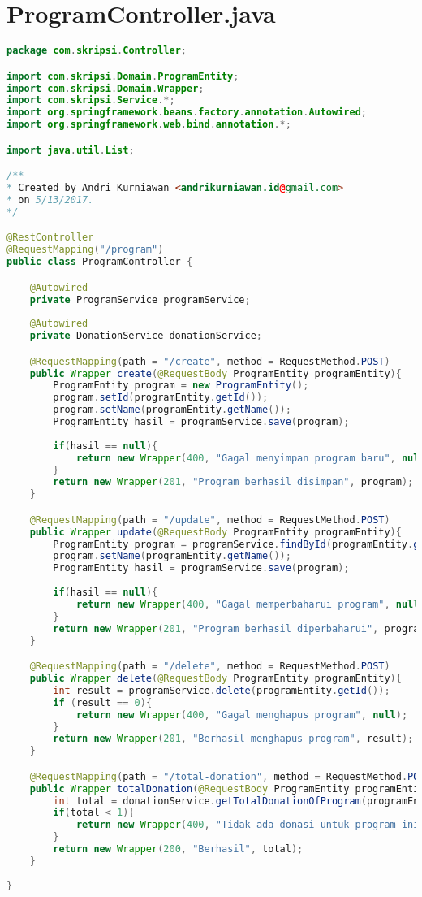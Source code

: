 \newpage
\section*{ProgramController.java}
\begin{lstlisting}[caption={Berkas ProgramController.java},label={lst:ProgramController},language=Java]
package com.skripsi.Controller;

import com.skripsi.Domain.ProgramEntity;
import com.skripsi.Domain.Wrapper;
import com.skripsi.Service.*;
import org.springframework.beans.factory.annotation.Autowired;
import org.springframework.web.bind.annotation.*;

import java.util.List;

/**
* Created by Andri Kurniawan <andrikurniawan.id@gmail.com>
* on 5/13/2017.
*/

@RestController
@RequestMapping("/program")
public class ProgramController {

	@Autowired
	private ProgramService programService;
	
	@Autowired
	private DonationService donationService;

	@RequestMapping(path = "/create", method = RequestMethod.POST)
	public Wrapper create(@RequestBody ProgramEntity programEntity){
		ProgramEntity program = new ProgramEntity();
		program.setId(programEntity.getId());
		program.setName(programEntity.getName());
		ProgramEntity hasil = programService.save(program);
		
		if(hasil == null){
			return new Wrapper(400, "Gagal menyimpan program baru", null);
		}
		return new Wrapper(201, "Program berhasil disimpan", program);
	}

	@RequestMapping(path = "/update", method = RequestMethod.POST)
	public Wrapper update(@RequestBody ProgramEntity programEntity){
		ProgramEntity program = programService.findById(programEntity.getId());
		program.setName(programEntity.getName());
		ProgramEntity hasil = programService.save(program);
		
		if(hasil == null){
			return new Wrapper(400, "Gagal memperbaharui program", null);
		}
		return new Wrapper(201, "Program berhasil diperbaharui", program);
	}

	@RequestMapping(path = "/delete", method = RequestMethod.POST)
	public Wrapper delete(@RequestBody ProgramEntity programEntity){
		int result = programService.delete(programEntity.getId());
		if (result == 0){
			return new Wrapper(400, "Gagal menghapus program", null);
		}
		return new Wrapper(201, "Berhasil menghapus program", result);
	}

	@RequestMapping(path = "/total-donation", method = RequestMethod.POST)
	public Wrapper totalDonation(@RequestBody ProgramEntity programEntity){
		int total = donationService.getTotalDonationOfProgram(programEntity.getId());
		if(total < 1){
			return new Wrapper(400, "Tidak ada donasi untuk program ini", 0);
		}
		return new Wrapper(200, "Berhasil", total);
	}
	
}

\end{lstlisting}

